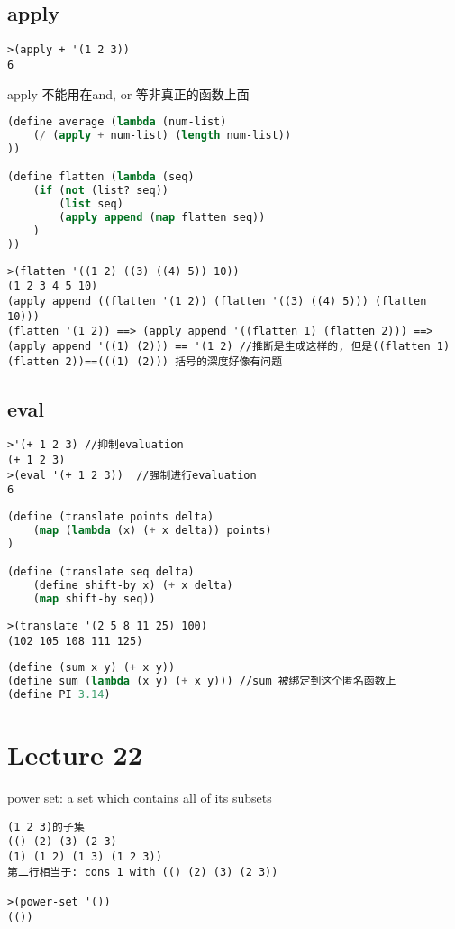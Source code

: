 \documentclass{article}
\begin{document}
\subsection{apply}
\begin{verbatim}
>(apply + '(1 2 3))
6
\end{verbatim}apply 不能用在and, or 等非真正的函数上面

\begin{lstlisting}[language = Lisp]
(define average (lambda (num-list)
	(/ (apply + num-list) (length num-list))
))

(define flatten (lambda (seq)
	(if (not (list? seq))
		(list seq)
		(apply append (map flatten seq))
	)
))
\end{lstlisting}

\begin{verbatim}
>(flatten '((1 2) ((3) ((4) 5)) 10))
(1 2 3 4 5 10)
(apply append ((flatten '(1 2)) (flatten '((3) ((4) 5))) (flatten 10)))
(flatten '(1 2)) ==> (apply append '((flatten 1) (flatten 2))) ==> (apply append '((1) (2))) == '(1 2) //推断是生成这样的, 但是((flatten 1) (flatten 2))==(((1) (2))) 括号的深度好像有问题
\end{verbatim}

\subsection{eval}
\begin{verbatim}
>'(+ 1 2 3) //抑制evaluation
(+ 1 2 3)
>(eval '(+ 1 2 3))  //强制进行evaluation
6
\end{verbatim}

\begin{lstlisting}[language = Lisp]
(define (translate points delta)
	(map (lambda (x) (+ x delta)) points)
)

(define (translate seq delta)
	(define shift-by x) (+ x delta)
	(map shift-by seq))
\end{lstlisting}

\begin{verbatim}
>(translate '(2 5 8 11 25) 100)
(102 105 108 111 125)
\end{verbatim}

\begin{lstlisting}[language = Lisp]
(define (sum x y) (+ x y))
(define sum (lambda (x y) (+ x y))) //sum 被绑定到这个匿名函数上
(define PI 3.14)
\end{lstlisting}

\section{Lecture 22}
power set: a set which contains all of its subsets
\begin{verbatim}
(1 2 3)的子集
(() (2) (3) (2 3)
(1) (1 2) (1 3) (1 2 3))
第二行相当于: cons 1 with (() (2) (3) (2 3))

>(power-set '())
(())
\end{verbatim}
\end{document}
